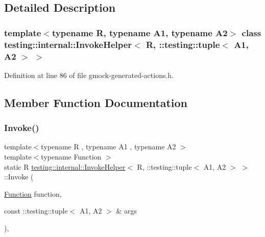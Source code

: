 \subsection{Detailed Description}
\subsubsection*{template$<$typename R, typename A1, typename A2$>$\newline
class testing\+::internal\+::\+Invoke\+Helper$<$ R, \+::testing\+::tuple$<$ A1, A2 $>$ $>$}



Definition at line 86 of file gmock-\/generated-\/actions.\+h.



\subsection{Member Function Documentation}
\mbox{\label{classtesting_1_1internal_1_1InvokeHelper_3_01R_00_01_1_1testing_1_1tuple_3_01A1_00_01A2_01_4_01_4_af3863b86ae4b7fbfd5a5f14e20b57423}} 
\subsubsection{\texorpdfstring{Invoke()}{Invoke()}}
{\footnotesize\ttfamily template$<$typename R , typename A1 , typename A2 $>$ \\
template$<$typename Function $>$ \\
static R \hyperlink{classtesting_1_1internal_1_1InvokeHelper}{testing\+::internal\+::\+Invoke\+Helper}$<$ R, \+::testing\+::tuple$<$ A1, A2 $>$ $>$\+::Invoke (\begin{DoxyParamCaption}\item[{\hyperlink{structtesting_1_1internal_1_1Function}{Function}}]{function,  }\item[{const \+::testing\+::tuple$<$ A1, A2 $>$ \&}]{args }\end{DoxyParamCaption})\hspace{0.3cm}{\ttfamily [inline]}, {\ttfamily [static]}}



